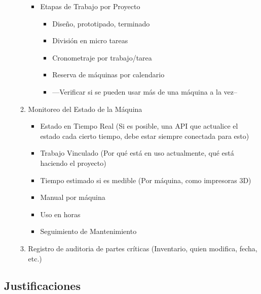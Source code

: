 \documentclass{article}
\begin{document}
\begin{enumerate}
\begin{enumerate}
\begin{itemize}
\begin{itemize}
                        \end{itemize}
                  \item Etapas de Trabajo por Proyecto
                        \begin{itemize}
                          \item Diseño, prototipado, terminado
                          \item División en micro tareas
                          \item Cronometraje por trabajo/tarea
                          \item Reserva de máquinas por calendario
                          \item ---Verificar si se pueden usar más de una máquina a la vez--
                        \end{itemize}
                \end{itemize}
          \item Monitoreo del Estado de la Máquina
                \begin{itemize}
                  \item Estado en Tiempo Real (Si es posible, una API que actualice el estado cada cierto tiempo, debe estar siempre conectada para esto)
                  \item Trabajo Vinculado (Por qué está en uso actualmente, qué está haciendo el proyecto)
                  \item Tiempo estimado si es medible (Por máquina, como impresoras 3D)
                  \item Manual por máquina
                  \item Uso en horas
                  \item Seguimiento de Mantenimiento
                \end{itemize}

          \item Registro de auditoria de partes críticas (Inventario, quien modifica, fecha, etc.)
        \end{enumerate}
\end{enumerate}
\subsection{Justificaciones}
\end{document}
